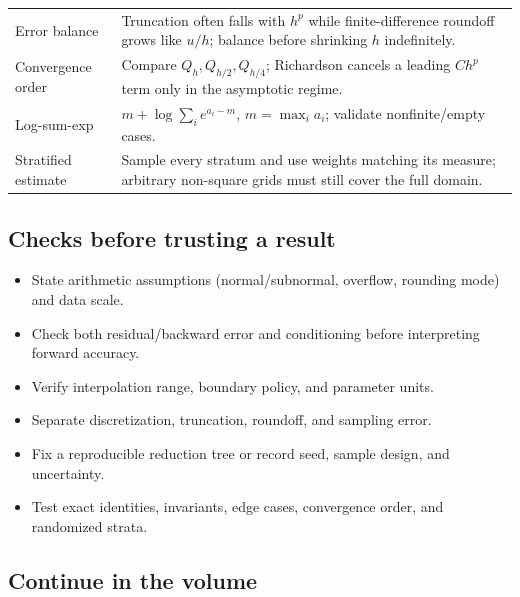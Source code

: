 {\begin{longtable}[]{@{}
  >{\raggedright\arraybackslash}p{}
  >{\raggedright\arraybackslash}p{}@{}}
Error balance & Truncation often falls with \(h^p\) while finite-difference roundoff grows like \(u/h\); balance before shrinking \(h\) indefinitely. \\
Convergence order & Compare \(Q_h,Q_{h/2},Q_{h/4}\); Richardson cancels a leading \(Ch^p\) term only in the asymptotic regime. \\
Log-sum-exp & \(m+\log\sum_i e^{a_i-m}\), \(m=\max_i a_i\); validate nonfinite/empty cases. \\
Stratified estimate & Sample every stratum and use weights matching its measure; arbitrary non-square grids must still cover the full domain. \\
\end{longtable}
}

\subsection{Checks before trusting a result}\label{appendix-cb5af353ef77-checks-before-trusting-a-result}

\hypertarget{appendix-cb5af353ef77-checks-before-trusting-a-result}{}

\begin{itemize}
\tightlist
\item
  State arithmetic assumptions (normal/subnormal, overflow, rounding mode) and data scale.
\item
  Check both residual/backward error and conditioning before interpreting forward accuracy.
\item
  Verify interpolation range, boundary policy, and parameter units.
\item
  Separate discretization, truncation, roundoff, and sampling error.
\item
  Fix a reproducible reduction tree or record seed, sample design, and uncertainty.
\item
  Test exact identities, invariants, edge cases, convergence order, and randomized strata.
\end{itemize}

\subsection{Continue in the volume}\label{appendix-cb5af353ef77-continue-in-the-volume}

\hypertarget{appendix-cb5af353ef77-continue-in-the-volume}{}

